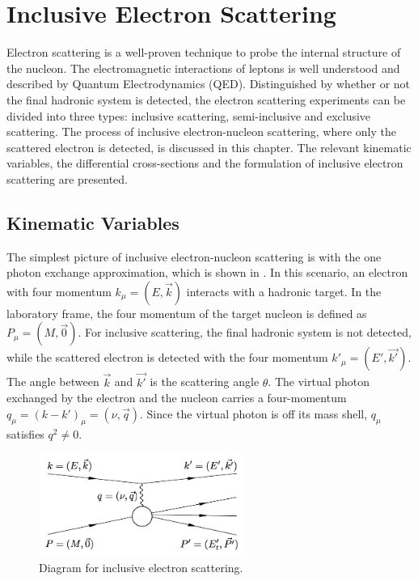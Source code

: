 
\chapter{Inclusive Electron Scattering}
\label{C2}

Electron scattering is a well-proven technique to probe the internal structure of the nucleon. The electromagnetic interactions of leptons is well understood and described by Quantum Electrodynamics (QED). Distinguished by whether or not the final hadronic system is detected, the electron scattering experiments can be divided into three types: inclusive scattering, semi-inclusive and exclusive scattering. The process of inclusive electron-nucleon scattering, where only the scattered electron is detected, is discussed in this chapter. The relevant kinematic variables, the differential cross-sections and the formulation of inclusive electron scattering are presented.

\section{Kinematic Variables}
\label{C2S1}

The simplest picture of inclusive electron-nucleon scattering is with the one photon exchange approximation, which is shown in . In this scenario, an electron with four momentum $k_\mu=(E,\vec{k})$ interacts with a hadronic target. In the laboratory frame, the four momentum of the target nucleon is defined as $P_\mu=(M,\vec{0})$. For inclusive scattering, the final hadronic system is not detected, while the scattered electron is detected with the four momentum $k'_\mu=(E',\vec{k'})$. The angle between $\vec{k}$ and $\vec{k'}$ is the scattering angle $\theta$. The virtual photon exchanged by the electron and the nucleon carries a four-momentum $q_\mu=(k-k')_\mu=(\nu,\vec{q})$. Since the virtual photon is off its mass shell, $q_\mu$ satisfies $q^2\ne 0$.

\begin{figure}[tb!]
  \centering
  \includegraphics[width=0.6\textwidth]{figs/inclusive-scattering.png}
  \caption[Diagram for inclusive electron scattering.]{Diagram for inclusive electron scattering. \label{C2S1F1}}
\end{figure}

